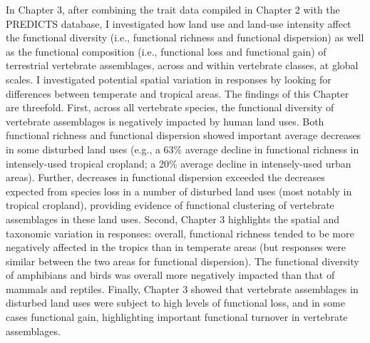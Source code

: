 In Chapter 3, after combining the trait data compiled in Chapter 2 with the PREDICTS database, I investigated how land use and land-use intensity affect the functional diversity (i.e., functional richness and functional dispersion) as well as the functional composition (i.e., functional loss and functional gain) of terrestrial vertebrate assemblages, across and within vertebrate classes, at global scales. I investigated potential spatial variation in responses by looking for differences between temperate and tropical areas. The findings of this Chapter are threefold. First, across all vertebrate species, the functional diversity of vertebrate assemblages is negatively impacted by human land uses. Both functional richness and functional dispersion showed important average decreases in some disturbed land uses (e.g., a 63\% average decline in functional richness in intensely-used tropical cropland; a 20\% average decline in intensely-used urban areas). Further, decreases in functional dispersion exceeded the decreases expected from species loss in a number of disturbed land uses (most notably in tropical cropland), providing evidence of functional clustering of vertebrate assemblages in these land uses. Second, Chapter 3 highlights the spatial and taxonomic variation in responses: overall, functional richness tended to be more negatively affected in the tropics than in temperate areas (but responses were similar between the two areas for functional dispersion). The functional diversity of amphibians and birds was overall more negatively impacted than that of mammals and reptiles. Finally, Chapter 3 showed that vertebrate assemblages in disturbed land uses were subject to high levels of functional loss, and in some cases functional gain, highlighting important functional turnover in vertebrate assemblages. 


